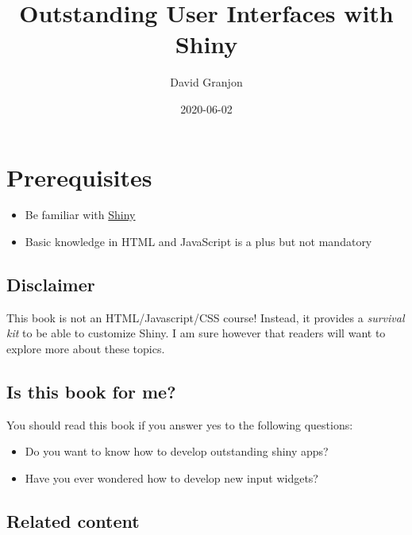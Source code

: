 \documentclass[
]{book}
\title{Outstanding User Interfaces with Shiny}
\author{David Granjon}
\date{2020-06-02}
\providecommand{\tightlist}{%
  \setlength{\itemsep}{0pt}\setlength{\parskip}{0pt}}
\begin{document}
\maketitle

{
\setcounter{tocdepth}{1}
\tableofcontents
}
\hypertarget{prerequisites}{%
\chapter*{Prerequisites}\label{prerequisites}}

\begin{itemize}
\tightlist
\item
  Be familiar with \href{https://mastering-shiny.org}{Shiny}
\item
  Basic knowledge in HTML and JavaScript is a plus but not mandatory
\end{itemize}

\hypertarget{disclaimer}{%
\section*{Disclaimer}\label{disclaimer}}

This book is not an HTML/Javascript/CSS course! Instead, it provides a \emph{survival kit} to be able to customize Shiny. I am sure however that readers will want to explore more about these topics.

\hypertarget{is-this-book-for-me}{%
\section*{Is this book for me?}\label{is-this-book-for-me}}

You should read this book if you answer yes to the following questions:

\begin{itemize}
\tightlist
\item
  Do you want to know how to develop outstanding shiny apps?
\item
  Have you ever wondered how to develop new input widgets?
\end{itemize}

\hypertarget{related-content}{%
\section*{Related content}\label{related-content}}
\end{document}
